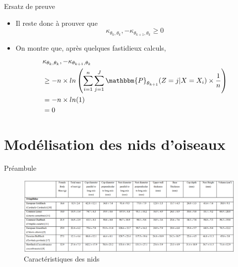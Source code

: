 \documentclass[11pt]{beamer}
\begin{document}
	\begin{frame}{Ersatz de preuve}
		\begin{block}{}
			\begin{itemize}
				\item Il reste donc à prouver que
					\[
					\kappa_{\theta_{k}, \theta_k}, - \kappa_{\theta_{k+1}, \theta_k} \geq 0
					\]
				\item On montre que, après quelques fastidieux calculs,
				\begin{align*}
					& \kappa_{\theta_{k}, \theta_k}, - \kappa_{\theta_{k+1}, \theta_k} \\
					& \geq - n\times ln\left( \sum_{i=1}^n\sum_{j=1}^J\mathbbm{P}_{\theta_{k+1}}(Z = j|X=X_i)\times\frac{1}{n}\right) \\
					&=  -n\times ln(1)\\
					&= 0
				\end{align*}
			\end{itemize}
		\end{block}
	\end{frame}

	\section{Modélisation des nids d'oiseaux}

	\begin{frame}{Préambule}
		\begin{figure}[H]
			\centering
			\includegraphics[scale=0.3]{tab_oiseaux.png}
			\caption{Caractéristiques des nids}
		\end{figure}
	\end{frame}	
\end{document}
